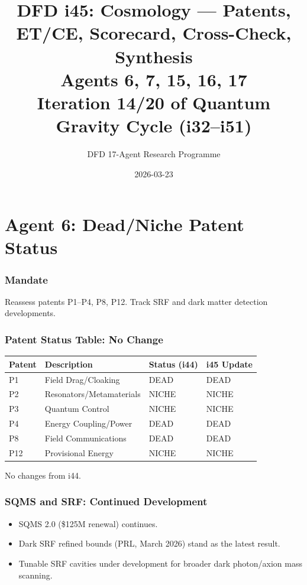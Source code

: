 \documentclass[11pt,a4paper]{article}
\title{DFD i45: Cosmology --- Patents, ET/CE, Scorecard, Cross-Check, Synthesis\\[6pt]
\large Agents 6, 7, 15, 16, 17\\[6pt]
\normalsize Iteration 14/20 of Quantum Gravity Cycle (i32--i51)}
\author{DFD 17-Agent Research Programme}
\date{2026-03-23}
\begin{document}
\maketitle
\tableofcontents
\newpage

\part{Agent 6: Dead/Niche Patent Status}
\label{part:agent6}

\section{Mandate}

Reassess patents P1--P4, P8, P12. Track SRF and dark matter detection developments.

\section{Patent Status Table: No Change}

\begin{center}
\begin{tabular}{llll}
\toprule
\textbf{Patent} & \textbf{Description} & \textbf{Status (i44)} & \textbf{i45 Update} \\
\midrule
P1 & Field Drag/Cloaking & DEAD & DEAD \\
P2 & Resonators/Metamaterials & NICHE & NICHE \\
P3 & Quantum Control & NICHE & NICHE \\
P4 & Energy Coupling/Power & DEAD & DEAD \\
P8 & Field Communications & DEAD & DEAD \\
P12 & Provisional Energy & NICHE & NICHE \\
\bottomrule
\end{tabular}
\end{center}

No changes from i44.

\section{SQMS and SRF: Continued Development}

\begin{itemize}
\item SQMS 2.0 (\$125M renewal) continues.
\item Dark SRF refined bounds (PRL, March 2026) stand as the latest result.
\item Tunable SRF cavities under development for broader dark photon/axion mass scanning.
\end{itemize}
\end{document}

